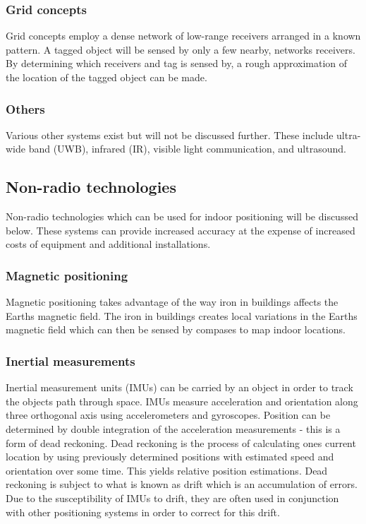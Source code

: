 \documentclass[11pt,a4paper]{article}
\begin{document}
	\subsubsection{Grid concepts}
		Grid concepts employ a dense network of low-range receivers arranged in a known pattern. A tagged object will be sensed by only a few nearby, networks receivers. By determining which receivers and tag is sensed by, a rough approximation of the location of the tagged object can be made.
	
	\subsubsection{Others}
		Various other systems exist but will not be discussed further. These include ultra-wide band (UWB), infrared (IR), visible light communication, and ultrasound.
	
	\subsection{Non-radio technologies}
		Non-radio technologies which can be used for indoor positioning will be discussed below. These systems can provide increased accuracy at the expense of increased costs of equipment and additional installations.
	
	\subsubsection{Magnetic positioning}
		Magnetic positioning takes advantage of the way iron in buildings affects the Earths magnetic field. The iron in buildings creates local variations in the Earths magnetic field which can then be sensed by compases to map indoor locations.
		\cite{supreeth_sudhakaran_geospatial_2014}
	
	\subsubsection{Inertial measurements}
		Inertial measurement units (IMUs) can be carried by an object in order to track the objects path through space. IMUs measure acceleration and orientation along three orthogonal axis using accelerometers and gyroscopes. Position can be determined by double integration of the acceleration measurements - this is a form of dead reckoning. Dead reckoning is the process of calculating ones current location by using previously determined positions with estimated speed and orientation over some time. This yields relative position estimations. Dead reckoning is subject to what is known as drift which is an accumulation of errors. Due to the susceptibility of IMUs to drift, they are often used in conjunction with other positioning systems in order to correct for this drift.
\end{document}
